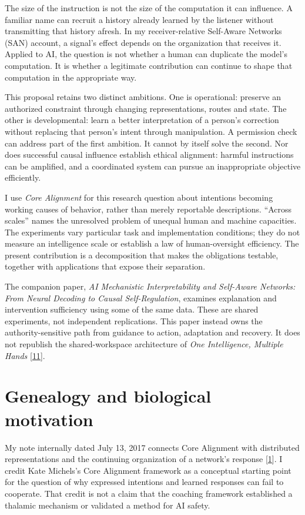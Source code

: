 \documentclass[11pt,letterpaper]{article}
\begin{document}
The size of the instruction is not the size of the computation it can influence. A familiar name can recruit a history already learned by the listener without transmitting that history afresh. In my receiver-relative Self-Aware Networks (SAN) account, a signal's effect depends on the organization that receives it. Applied to AI, the question is not whether a human can duplicate the model's computation. It is whether a legitimate contribution can continue to shape that computation in the appropriate way.

This proposal retains two distinct ambitions. One is operational: preserve an authorized constraint through changing representations, routes and state. The other is developmental: learn a better interpretation of a person's correction without replacing that person's intent through manipulation. A permission check can address part of the first ambition. It cannot by itself solve the second. Nor does successful causal influence establish ethical alignment: harmful instructions can be amplified, and a coordinated system can pursue an inappropriate objective efficiently.

I use \emph{Core Alignment} for this research question about intentions becoming working causes of behavior, rather than merely reportable descriptions. “Across scales” names the unresolved problem of unequal human and machine capacities. The experiments vary particular task and implementation conditions; they do not measure an intelligence scale or establish a law of human-oversight efficiency. The present contribution is a decomposition that makes the obligations testable, together with applications that expose their separation.

The companion paper, \emph{AI Mechanistic Interpretability and Self-Aware Networks: From Neural Decoding to Causal Self-Regulation}, examines explanation and intervention sufficiency using some of the same data. These are shared experiments, not independent replications. This paper instead owns the authority-sensitive path from guidance to action, adaptation and recovery. It does not republish the shared-workspace architecture of \emph{One Intelligence, Multiple Hands} [\hyperref[ref:11]{11}].

\section{Genealogy and biological motivation}

My note internally dated July 13, 2017 connects Core Alignment with distributed representations and the continuing organization of a network's response [\hyperref[ref:1]{1}]. I credit Kate Michels's Core Alignment framework as a conceptual starting point for the question of why expressed intentions and learned responses can fail to cooperate. That credit is not a claim that the coaching framework established a thalamic mechanism or validated a method for AI safety.
\end{document}
